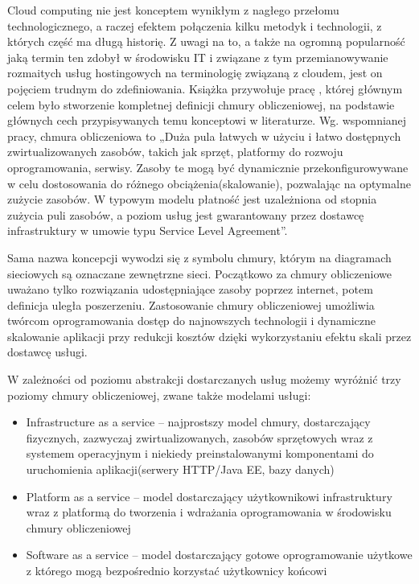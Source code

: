 	Cloud computing nie jest konceptem wynikłym z nagłego przełomu technologicznego, a raczej efektem połączenia kilku metodyk i technologii, z których część ma długą historię. Z uwagi na to, a także na ogromną popularność jaką termin ten zdobył w środowisku IT i związane z tym przemianowywanie rozmaitych usług hostingowych na terminologię związaną z cloudem, jest on pojęciem trudnym do zdefiniowania. Książka \cite{Rhoton09} przywołuje pracę \cite{Vaquero}, której głównym celem było stworzenie kompletnej definicji chmury obliczeniowej, na podstawie głównych cech przypisywanych temu konceptowi w literaturze. Wg. wspomnianej pracy, chmura obliczeniowa to „Duża pula łatwych w użyciu i łatwo dostępnych zwirtualizowanych zasobów, takich jak sprzęt, platformy do rozwoju oprogramowania, serwisy. Zasoby te mogą być dynamicznie przekonfigurowywane w celu dostosowania do różnego obciążenia(skalowanie), pozwalając na optymalne zużycie zasobów. W typowym modelu płatność jest uzależniona od stopnia zużycia puli zasobów, a poziom usług jest gwarantowany przez dostawcę infrastruktury w umowie typu Service Level Agreement”.

	Sama nazwa koncepcji wywodzi się z symbolu chmury, którym na diagramach sieciowych są oznaczane zewnętrzne  sieci. Początkowo za chmury obliczeniowe uważano tylko rozwiązania udostępniające zasoby poprzez internet, potem definicja uległa poszerzeniu. Zastosowanie chmury obliczeniowej umożliwia twórcom oprogramowania dostęp do najnowszych technologii i dynamiczne skalowanie aplikacji przy redukcji kosztów dzięki wykorzystaniu efektu skali przez dostawcę usługi.
 
	W zależności od poziomu abstrakcji dostarczanych usług możemy wyróżnić trzy poziomy chmury obliczeniowej, zwane także modelami usługi:
	
	\begin{itemize}
	\item Infrastructure as a service – najprostszy model chmury, dostarczający fizycznych, zazwyczaj zwirtualizowanych, zasobów sprzętowych wraz z systemem operacyjnym i niekiedy preinstalowanymi komponentami do uruchomienia aplikacji(serwery HTTP/Java EE, bazy danych)

	\item Platform as a service – model dostarczający użytkownikowi infrastruktury wraz z platformą do tworzenia i wdrażania oprogramowania w środowisku chmury obliczeniowej

	\item Software as a service – model dostarczający gotowe oprogramowanie użytkowe z którego mogą  bezpośrednio korzystać użytkownicy końcowi
	\end{itemize}
	
